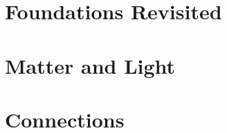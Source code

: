 \documentclass[12pt]{book}
\begin{document}
\part{Foundations Revisited}\label{part:foundations-revisited}





\part{Matter and Light}








\part{Connections}









\appendix
\renewcommand{\thechapter}{}
\renewcommand{\chaptername}{Appendix}
\renewcommand{\thesection}{\arabic{section}}


\backmatter


\small
\printindex
\end{document}
